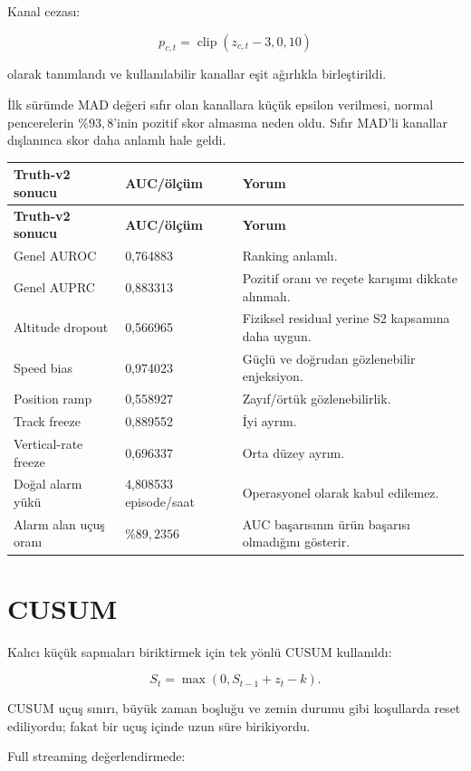 \documentclass[11pt,a4paper,oneside]{report}
\begin{document}
Kanal cezası:

\[
p_{c,t}
= \operatorname{clip}(z_{c,t}-3,0,10)
\]

olarak tanımlandı ve kullanılabilir kanallar eşit ağırlıkla birleştirildi.

İlk sürümde MAD değeri sıfır olan kanallara küçük epsilon verilmesi, normal
pencerelerin \(\%93{,}8\)'inin pozitif skor almasına neden oldu. Sıfır
MAD'li kanallar dışlanınca skor daha anlamlı hale geldi.

\begin{longtable}{L{0.36\textwidth}L{0.20\textwidth}L{0.35\textwidth}}
\toprule
\textbf{Truth-v2 sonucu} & \textbf{AUC/ölçüm} & \textbf{Yorum}\\
\midrule
\endfirsthead
\toprule
\textbf{Truth-v2 sonucu} & \textbf{AUC/ölçüm} & \textbf{Yorum}\\
\midrule
\endhead
Genel AUROC & 0,764883 & Ranking anlamlı.\\
Genel AUPRC & 0,883313 & Pozitif oranı ve reçete karışımı dikkate alınmalı.\\
Altitude dropout & 0,566965 & Fiziksel residual yerine S2 kapsamına daha uygun.\\
Speed bias & 0,974023 & Güçlü ve doğrudan gözlenebilir enjeksiyon.\\
Position ramp & 0,558927 & Zayıf/örtük gözlenebilirlik.\\
Track freeze & 0,889552 & İyi ayrım.\\
Vertical-rate freeze & 0,696337 & Orta düzey ayrım.\\
Doğal alarm yükü & 4,808533 episode/saat & Operasyonel olarak kabul edilemez.\\
Alarm alan uçuş oranı & \(\%89{,}2356\) & AUC başarısının ürün başarısı olmadığını gösterir.\\
\bottomrule
\end{longtable}

\section{CUSUM}

Kalıcı küçük sapmaları biriktirmek için tek yönlü CUSUM kullanıldı:

\[
S_t=\max\left(0,S_{t-1}+z_t-k\right).
\]

CUSUM uçuş sınırı, büyük zaman boşluğu ve zemin durumu gibi koşullarda reset
ediliyordu; fakat bir uçuş içinde uzun süre birikiyordu.

Full streaming değerlendirmede:
\end{document}
